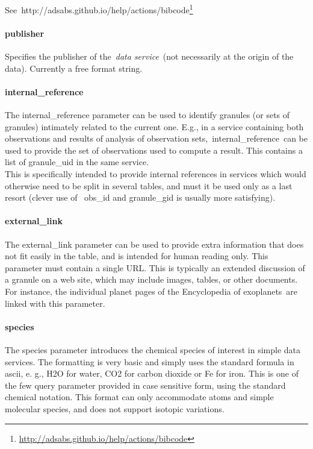 \documentclass[11pt,a4paper]{ivoa}
\begin{document}
See http://adsabs.github.io/help/actions/bibcode\footnote{\url{http://adsabs.github.io/help/actions/bibcode}}

\paragraph{publisher}

Specifies the publisher of the \emph{data service} (not necessarily at the origin of the data). Currently a free format string.\\

\paragraph{internal\_reference}

The internal\_reference parameter can be used to identify granules (or sets of granules) intimately related to the current one. E.g., in a service containing both observations and results of analysis of observation sets, internal\_reference can be used to provide the set of observations used to compute a result. This contains a list of granule\_uid in the same service.\\This is specifically intended to provide internal references in services which would otherwise need to be split in several tables, and must it be used only as a last resort (clever use of  obs\_id and granule\_gid is usually more satisfying). 

\paragraph{external\_link}

The external\_link parameter can be used to provide extra information that does not fit easily in the table, and is intended for human reading only. This parameter must contain a single URL. This is typically an extended discussion of a granule on a web site, which may include images, tables, or other documents. For instance, the individual planet pages of the Encyclopedia of exoplanets are linked with this parameter.\\

\paragraph{species}

The species parameter introduces the chemical species of interest in simple data services. The formatting is very basic and simply uses the standard formula in ascii, e. g., H2O for water, CO2 for carbon dioxide or Fe for iron. This is one of the few query parameter provided in case sensitive form, using the standard chemical notation. This format can only accommodate atoms and simple molecular species, and does not support isotopic variations.  
\end{document}
